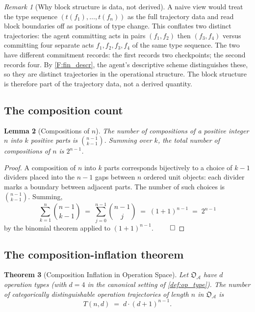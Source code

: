 \documentclass[11pt,twocolumn,a4paper]{article}
\theoremstyle{thmstyle}
\newtheorem{theorem}{Theorem}[section]
\newtheorem{lemma}[theorem]{Lemma}
\theoremstyle{definition}
\theoremstyle{remark}
\newtheorem{remark}[theorem]{Remark}
\newcommand{\Agent}{\mathcal{A}}
\newcommand{\OpStr}{\mathfrak{O}}
\begin{document}
\begin{remark}[Why block structure is data, not derived]
\label{rem:why_blocks}
A naive view would treat the type sequence $(t(f_1), \ldots, t(f_n))$
as the full trajectory data and read block boundaries off as
positions of type change. This conflates two distinct
trajectories: the agent committing acts in pairs $(f_1, f_2)$ then
$(f_3, f_4)$ versus committing four separate acts $f_1, f_2, f_3,
f_4$ of the same type sequence. The two have different commitment
records: the first records two checkpoints; the second records
four. By \cref{F:fin_descr}, the agent's descriptive scheme
distinguishes these, so they are distinct trajectories in the
operational structure. The block structure is therefore part of the
trajectory data, not a derived quantity.
\end{remark}

\subsection{The composition count}

\begin{lemma}[Compositions of $n$]
\label{lem:compositions}
The number of compositions of a positive integer $n$ into $k$
positive parts is $\binom{n-1}{k-1}$. Summing over $k$, the total
number of compositions of $n$ is $2^{n-1}$.
\end{lemma}

\begin{proof}
A composition of $n$ into $k$ parts corresponds bijectively to a
choice of $k - 1$ dividers placed into the $n - 1$ gaps between
$n$ ordered unit objects: each divider marks a boundary between
adjacent parts. The number of such choices is $\binom{n-1}{k-1}$.
Summing,
\[
  \sum_{k=1}^{n} \binom{n-1}{k-1}
  \;=\; \sum_{j=0}^{n-1} \binom{n-1}{j}
  \;=\; (1+1)^{n-1}
  \;=\; 2^{n-1}
\]
by the binomial theorem applied to $(1+1)^{n-1}$. $\qed$
\end{proof}

\subsection{The composition-inflation theorem}

\begin{theorem}[Composition Inflation in Operation Space]
\label{thm:composition_inflation}
Let $\OpStr_\Agent$ have $d$ operation types (with $d = 4$ in the
canonical setting of \cref{def:op_type}). The number of
categorically distinguishable operation trajectories of length $n$
in $\OpStr_\Agent$ is
\[
  \boxed{\;T(n, d) \;=\; d \cdot (d + 1)^{n - 1}.\;}
\]
\end{theorem}
\end{document}
